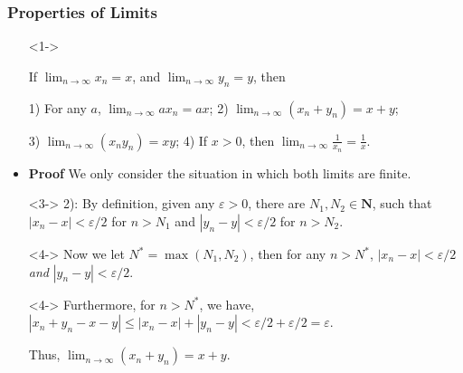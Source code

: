\documentclass[handout]{beamer}
\begin{document}
\frame
{
  \frametitle{Properties of Limits}

   \begin{itemize}
  \item [] <1-> \begin{Theorem} If $\lim_{n\rightarrow\infty} x_n=x$, and $\lim_{n\rightarrow\infty} y_n=y$, then 
  
  1) For any $a$, $\lim_{n\rightarrow\infty} a x_n=ax$; 2) $\lim_{n\rightarrow\infty} (x_n+y_n)=x+y$; 
  
  3) $\lim_{n\rightarrow\infty} (x_ny_n)=xy$; 4) If $x>0$, then $\lim_{n\rightarrow\infty} \frac{1}{x_n}=\frac{1}{x}$.
   \end{Theorem} 
    
      \item<2-> \textbf{Proof} We only consider the situation in which both limits are finite. 

    \item[]<3->  2): By definition, given any $\varepsilon>0$, there are $N_1, N_2\in \mathbf{N}$, such that $|x_n-x|<\varepsilon/2$ for $n>N_1$ and $|y_n-y|<\varepsilon/2$ for $n>N_2$.
        \item[]<4-> Now we let $N^*=\max(N_1, N_2)$, then for any $n>N^*$, $|x_n-x|<\varepsilon/2$ \textit{ and } $|y_n-y|<\varepsilon/2$.

        \item[]<4-> Furthermore, for $n>N^*$, we have, $|x_n+y_n-x-y|\leq |x_n-x|+|y_n-y|<\varepsilon/2+\varepsilon/2=\varepsilon$. 
        
        Thus, $\lim_{n\rightarrow\infty} (x_n+y_n)=x+y$.
        
        
  \end{itemize}
}
\end{document}
